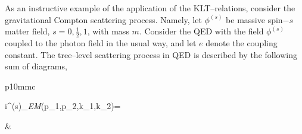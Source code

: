 \documentclass[11pt,a4paper]{article}
\newcommand{\M}{\mathcal{M}}
\begin{document}
As an instructive example of the application of the KLT--relations, consider the gravitational Compton scattering process. Namely, let $\phi^{(s)}$ be massive spin$-s$ matter field, $s=0,\frac{1}{2},1$, with mass $m$. Consider the QED with the field $\phi^{(s)}$ coupled to the photon field in the usual way, and let $e$ denote the coupling constant. The tree--level scattering process in QED is described by the following sum of diagrams,
\newline
\begin{tabular}{p{10mm}c}
\begin{flalign*}
i\M^{(s)}_{\textit{EM}}(p_1,p_2,k_1,k_2)=
\end{flalign*}
&
\end{tabular}
\end{document}
